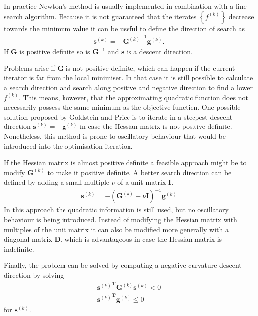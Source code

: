 In practice Newton's method is usually implemented in combination with a
line-search algorithm. Because it is not guaranteed that the iterates
$\left\{f^{(k)}\right\}$ decrease towards the minimum value it can be useful to
define the direction of search as
%
\begin{align}
    \mathbf{s}^{(k)}=-{\mathbf{G}^{(k)}}^{-1}\mathbf{g}^{(k)}.
\end{align}
%
If $\mathbf{G}$ is positive definite so is $\mathbf{G}^{-1}$ and $\mathbf{s}$ is
a descent direction.

Problems arise if $\mathbf{G}$ is not positive definite, which can happen if
the current iterator is far from the local minimiser. In that case it is still
possible to calculate a search direction and search along positive and negative
direction to find a lower $f^{(k)}$. This means, however, that the
approximating quadratic function does not necessarily possess the same minimum
as the objective function. One possible solution proposed by Goldstein and
Price\autocite{Goldstein_effectivealgorithmminimization_1967} is to iterate in
a steepest descent direction $\mathbf{s}^{(k)}=-\mathbf{g}^{(k)}$ in case the
Hessian matrix is not positive definite. Nonetheless, this method is prone to
oscillatory behaviour that would be introduced into the optimisation iteration.

If the Hessian matrix is almost positive definite a feasible approach might be
to modify $\mathbf{G}^{(k)}$ to make it positive definite. A better search
direction can be defined by adding a small multiple $\nu$ of a unit matrix
$\mathbf{I}$.
\autocite{Levenberg_methodsolutioncertain_1944,Marquardt_AlgorithmLeastSquaresEstimation_1963,Goldfeld_MaximizationQuadraticHillClimbing_1966}
%
\begin{align}
\mathbf{s}^{(k)}=-\left(\mathbf{G}^{(k)}+\nu\mathbf{I}\right)^{-1}\mathbf{g}^{(k)}
\end{align}
%
In this approach the quadratic information is still used, but no oscillatory
behaviour is being introduced. Instead of modifying the Hessian matrix with
multiples of the unit matrix it can also be modified more generally with a
diagonal matrix $\mathbf{D}$, which is advantageous in case the Hessian matrix
is indefinite.
\autocite{Murray_Secondderivativemethods_1972,Hebden_algorithmminimizationusing_1973}

Finally, the problem can be solved by computing a negative curvature descent
direction by solving
%
\begin{align}
    {\mathbf{s}^{(k)}}^\mathbf{T}\mathbf{G}^{(k)}\mathbf{s}^{(k)}<0\\
    {\mathbf{s}^{(k)}}^\mathbf{T}\mathbf{g}^{(k)}\leq0
\end{align}
for $\mathbf{s}^{(k)}$.\autocite{Fiacco_NonlinearProgramming_1990}


